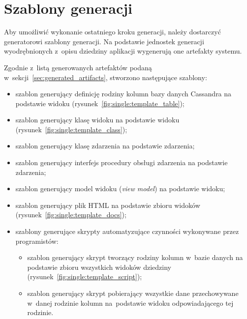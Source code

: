 \section{Szablony generacji}

Aby umożliwić wykonanie ostatniego kroku generacji, należy dostarczyć generatorowi szablony generacji.
Na podstawie jednostek generacji wyodrębnionych z~opisu dziedziny aplikacji wygenerują one artefakty systemu.

Zgodnie z~listą generowanych artefaktów podaną w~sekcji~\ref{sec:generated_artifacts}, stworzono następujące szablony:

\begin{itemize}
 \item szablon generujący definicję rodziny kolumn bazy danych Cassandra na podstawie widoku (rysunek~\ref{fig:single:template_table});
 \item szablon generujący klasę widoku na podstawie widoku (rysunek~\ref{fig:single:template_class});
 \item szablon generujący klasę zdarzenia na podstawie zdarzenia;
 \item szablon generujący interfejs procedury obsługi zdarzenia na podstawie zdarzenia; 
 \item szablon generujący model widoku (\emph{view model}) na podstawie widoku;
 \item szablon generujący plik HTML na podstawie zbioru widoków (rysunek~\ref{fig:single:template_docs});
 \item szablony generujące skrypty automatyzujące czynności wykonywane przez programistów:
  \begin{itemize}
   \item szablon generujący skrypt tworzący rodziny kolumn w~bazie danych na podstawie zbioru wszystkich widoków dziedziny (rysunek~\ref{fig:single:template_script});
   \item szablon generujący skrypt pobierający wszystkie dane przechowywane w~danej rodzinie kolumn na~podstawie widoku odpowiadającego tej rodzinie.
  \end{itemize}
\end{itemize}











